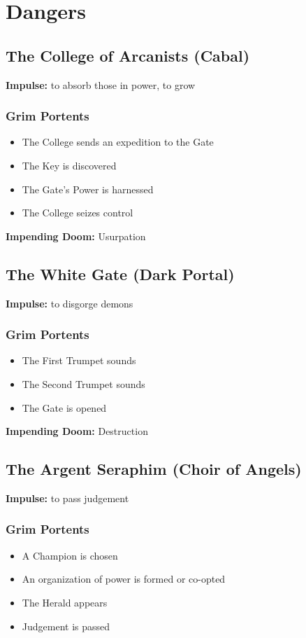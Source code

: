 \section{Dangers}
\subsection{The College of Arcanists (Cabal)}


 \textbf{Impulse:}
 to absorb those in power, to grow
\subsubsection{Grim Portents}
\begin{itemize}
\item The College sends an expedition to the Gate
\item The Key is discovered
\item The Gate's Power is harnessed
\item The College seizes control

\end{itemize}


 \textbf{Impending Doom:}
 Usurpation
\subsection{The White Gate (Dark Portal)}


 \textbf{Impulse:}
 to disgorge demons
\subsubsection{Grim Portents}
\begin{itemize}
\item The First Trumpet sounds
\item The Second Trumpet sounds
\item The Gate is opened

\end{itemize}


 \textbf{Impending Doom:}
 Destruction
\subsection{The Argent Seraphim (Choir of Angels)}


 \textbf{Impulse:}
 to pass judgement
\subsubsection{Grim Portents}
\begin{itemize}
\item A Champion is chosen
\item An organization of power is formed or co-opted
\item The Herald appears
\item Judgement is passed

\end{itemize}


